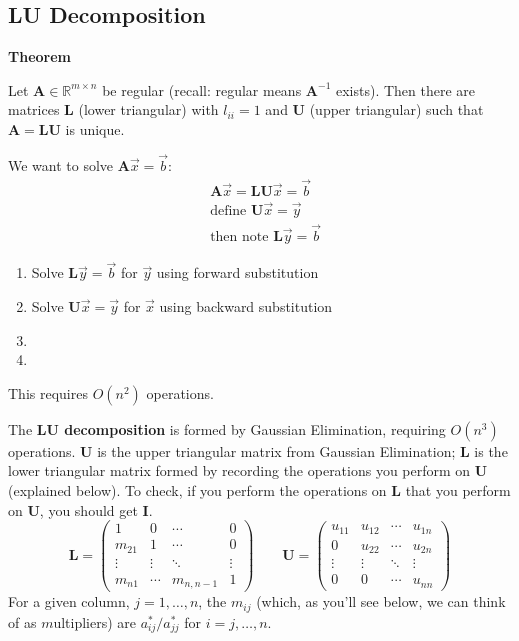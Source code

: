 \documentclass[12pt]{exam}
\newcommand{\ve}[1]{\ensuremath{\mathbf{#1}}}
\begin{document}
\subsection*{LU Decomposition}

\textbf{Theorem}

Let $\ve{A} \in \mathbb{R}^{m \times n}$ be regular (recall: regular means $\ve{A}^{-1}$ exists). Then there are matrices $\ve{L}$ (lower triangular) with $l_{ii} = 1$ and $\ve{U}$ (upper triangular) such that $\ve{A} = \ve{L}\ve{U}$ is unique.

We want to solve $\ve{A}\vec{x} = \vec{b}$:
%
\begin{align}
&\ve{A}\vec{x} = \ve{L}\ve{U}\vec{x} = \vec{b} \nonumber \\
%
&\text{define } \ve{U}\vec{x} = \vec{y} \nonumber \\
%
&\text{then note }\ve{L}\vec{y} = \vec{b} \nonumber
\end{align}
%
\begin{enumerate}
\ifprintanswers
\item Solve $\ve{L}\vec{y} = \vec{b}$ for $\vec{y}$ using forward substitution
\item Solve $\ve{U}\vec{x} = \vec{y}$ for $\vec{x}$ using backward substitution
\else
\item
\item
\fi
\end{enumerate}
%
This requires $O(n^2)$ operations.

The \textbf{LU decomposition} is formed by Gaussian Elimination, requiring $O(n^3)$ operations. $\ve{U}$ is the upper triangular matrix from Gaussian Elimination; $\ve{L}$ is the lower triangular matrix formed by recording the operations you perform on $\ve{U}$ (explained below). To check, if you perform the operations on $\ve{L}$ that you perform on $\ve{U}$, you should get $\ve{I}$.
%
\begin{equation}
   \ve{L} = \begin{pmatrix}
      1      & 0      & \cdots    & 0 \\
      m_{21} & 1      & \cdots    & 0 \\
      \vdots & \vdots & \ddots    & \vdots \\     
      m_{n1} & \cdots & m_{n,n-1} & 1 
    \end{pmatrix} \qquad
  \ve{U} = \begin{pmatrix}
      u_{11} & u_{12} & \cdots & u_{1n} \\
      0      & u_{22} & \cdots & u_{2n} \\
      \vdots & \vdots & \ddots & \vdots \\     
      0      & 0      & \cdots &  u_{nn} 
    \end{pmatrix}
    \nonumber   
\end{equation} 
%
For a given column, $j = 1, \dots, n$, the $m_{ij}$ (which, as you'll see below, we can think of as $m$ultipliers) are $a^*_{ij} / a^*_{jj}$ for $i = j, \dots, n$. 
\end{document}
